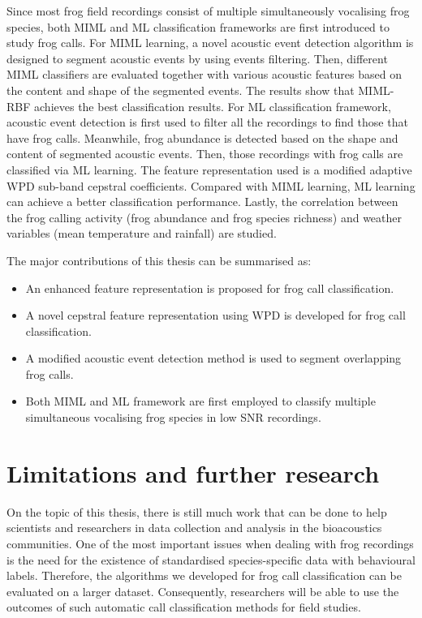 Since most frog field recordings consist of multiple simultaneously vocalising frog species, both MIML and ML classification frameworks are first introduced to study frog calls. For MIML learning, a novel acoustic event detection algorithm is designed to segment acoustic events by using events filtering. Then, different MIML classifiers are evaluated together with various acoustic features based on the content and shape of the segmented events. The results show that MIML-RBF achieves the best classification results. 
For ML classification framework, acoustic event detection is first used to filter all the recordings to find those that have frog calls. Meanwhile, frog abundance is detected based on the shape and content of segmented acoustic events. Then, those recordings with frog calls are classified via ML learning. The feature representation used is a modified adaptive WPD sub-band cepstral coefficients. Compared with MIML learning, ML learning can achieve a better classification performance. Lastly, the correlation between the frog calling activity (frog abundance and frog species richness) and weather variables (mean temperature and rainfall) are studied.



The major contributions of this thesis can be summarised as:
\begin{itemize}

\item An enhanced feature representation is proposed for frog call classification.
\item A novel cepstral feature representation using WPD is developed for frog call classification.
\item A modified acoustic event detection method is used to segment overlapping frog calls.
\item Both MIML and ML framework are first employed to classify multiple simultaneous vocalising frog species in low SNR recordings.

\end{itemize}


\section{Limitations and further research}	
On the topic of this thesis, there is still much work that can be done to help scientists and researchers in data collection and analysis in the bioacoustics communities. One of the most important issues when dealing with frog recordings is the need for the existence of standardised species-specific data with behavioural labels. 
Therefore, the algorithms we developed for frog call classification can be evaluated on a larger dataset. 
Consequently, researchers will be able to use the outcomes of such automatic call classification methods for field studies.

